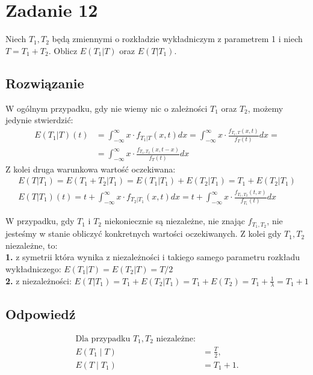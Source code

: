 \section{Zadanie 12}
Niech \(T_1, T_2\) będą zmiennymi o rozkładzie wykładniczym z parametrem 1 i niech \(T=T_1+T_2\). Oblicz \(E(T_1|T)\) oraz \(E(T|T_1)\).

\subsection*{Rozwiązanie}

W ogólnym przypadku, gdy nie wiemy nic o zależności \(T_1\) oraz \(T_2\), możemy jedynie stwierdzić:
\begin{align*}
	E(T_1|T)(t) & = \int_{-\infty}^{\infty} x \cdot f_{T_1| T}(x,t)dx = \int_{-\infty}^{\infty} x \cdot \frac{f_{T_1, T}{(x, t)}}{f_{T}(t)}dx= \\
	            & = \int_{-\infty}^{\infty} x \cdot \frac{f_{T_1, T_2}{(x, t-x)}}{f_{T}(t)}dx
\end{align*}
Z kolei druga warunkowa wartość oczekiwana:
\begin{align*}
	E(T|T_1) = E(T_1+T_2|T_1) = E(T_1|T_1) + E(T_2|T_1) = T_1 + E(T_2|T_1)
	\\
	E(T|T_1)(t) = t + \int_{-\infty}^{\infty}x \cdot f_{T_2 | T_1}(x, t)dx = t + \int_{-\infty}^{\infty}x\cdot \frac{f_{T_1, T_2}(t, x)}{f_{T_1}(t)} dx
\end{align*}

W przypadku, gdy \(T_1\) i \(T_2\) niekoniecznie są niezależne, nie znając \(f_{T_1, T_2}\), nie jesteśmy w stanie obliczyć konkretnych wartości oczekiwanych. Z kolei gdy \(T_1, T_2\) niezależne, to:\\
\textbf{1.} z symetrii która wynika z niezależności i takiego samego parametru rozkładu wykładniczego: \(E(T_1|T) = E(T_2|T) = T/2\)\\
\textbf{2.} z niezależności: \(E(T|T_1) = T_1 + E(T_2|T_1) = T_1 + E(T_2) = T_1 + \frac{1}{\lambda} = T_1 + 1\)

\subsection*{Odpowiedź}
\[
	\boxed{
		\begin{aligned}
			\text{Dla przypadku } T_1, T_2 \text{ niezależne:} \\
			E(T_1 \mid T) & = \frac{T}{2},                     \\
			E(T \mid T_1) & = T_1 + 1.
		\end{aligned}
	}
\]
